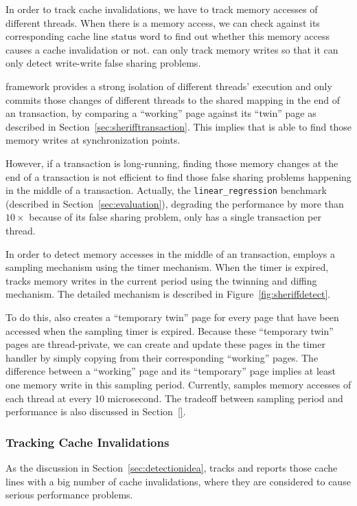 In order to track cache invalidations, we have to track memory accesses of different threads. When there is a memory access, we can check against its corresponding cache line status word to find out whether this memory access causes a cache invalidation or not. \SheriffDetect{} can only track memory writes so that it can only detect write-write false sharing problems. 

\sheriff{} framework provides a strong isolation of different threads' execution and only commits those changes of different threads to the shared mapping in the end of an transaction, by comparing a ``working'' page against its ``twin'' page as described in Section~\ref{sec:sherifftransaction}.
This implies that \sheriff{} is able to find those memory writes at synchronization points. 

However, if a transaction is long-running, finding those memory changes at the end of a transaction is not efficient to find those false sharing problems happening in the middle of a transaction. Actually, the \texttt{linear\_regression} benchmark (described in Section~\ref{sec:evaluation}), degrading the performance by more than $10\times$ because of its false sharing problem, only has a single transaction per thread. 

In order to detect memory accesses in the middle of an transaction, \SheriffDetect{} employs a sampling mechanism using the timer mechanism. When the timer is expired, \SheriffDetect{} tracks memory writes in the current period using the twinning and diffing mechanism. The detailed mechanism is described in Figure~\ref{fig:sheriffdetect}. 

To do this, \SheriffDetect{} also creates a ``temporary twin'' page for every page that have been accessed when the sampling timer is expired. Because these ``temporary twin'' pages are thread-private, we can create and update these pages in the timer handler by simply copying from their corresponding ``working'' pages. The difference between a ``working'' page and its ``temporary'' page implies at least one memory write in this sampling period. Currently, \SheriffDetect{} samples memory accesses of each thread at every 10 microsecond. The tradeoff between sampling period and performance is also discussed in Section~\ref{}. 

\subsubsection{Tracking Cache Invalidations}
\label{sec:invalidation}
As the discussion in Section~\ref{sec:detectionidea}, \SheriffDetect{} tracks and reports those cache lines with a big number of cache invalidations, where they are considered to cause serious performance problems. 

